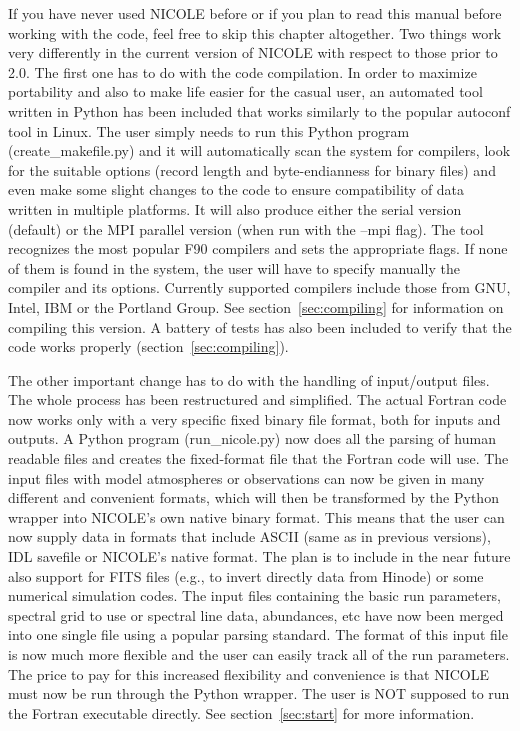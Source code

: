 If you have never used NICOLE before or if you plan to read this manual 
before working with the code, feel free to skip this chapter altogether.
Two things work very differently in the current version of NICOLE with
respect to those prior to 2.0. The first one has to do with the code
compilation. In order to maximize portability and also
to make life easier for the casual user, an automated tool written in
Python has been included that works similarly to the popular autoconf
tool in Linux. The user simply needs to run this Python program
(create\_makefile.py) and it will automatically scan the system for
compilers, look for the suitable options (record length and
byte-endianness for binary files) and even make some slight
changes to the code to ensure compatibility of data written in
multiple platforms. It will also produce either the serial version
(default) or the MPI parallel version (when run with the --mpi
flag). The tool recognizes the most popular F90 compilers and sets the
appropriate flags. If none of them is found in the system, the user
will have to specify manually the compiler and its options. Currently
supported compilers include those from GNU, Intel, IBM or the Portland
Group. See section~\ref{sec:compiling} for information on compiling
this version. A battery of tests has also been included to verify that
the code works properly (section~\ref{sec:compiling}).

The other important change has to do with the handling of input/output
files. The whole process has been restructured and simplified. The
actual Fortran code now works only with a very specific fixed binary
file format, both for inputs and outputs. A Python program
(run\_nicole.py) now does all the parsing of human readable files and
creates the fixed-format file that the Fortran code will use. The
input files with model atmospheres or observations can now be given in
many different and convenient formats, which will then be transformed
by the Python wrapper into NICOLE's own native binary format. This
means that the user can now supply data in formats that include ASCII
(same as in previous versions), IDL savefile or NICOLE's native
format. The plan is to include in the near future also support for
FITS files (e.g., to invert directly data from Hinode) or some
numerical simulation codes. The input files containing the basic run
parameters, spectral grid to use or spectral line data, abundances,
etc have now been merged into one single file using a popular parsing
standard. The format of this input file is now much more flexible and
the user can easily track all of the run parameters. The price to pay
for this increased flexibility and convenience is that NICOLE must now
be run through the Python wrapper. The user is NOT supposed to run the
Fortran executable directly. See section~\ref{sec:start} for more information.

